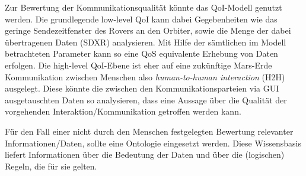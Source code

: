 Zur Bewertung der Kommunikationsqualit{\"a}t k{\"o}nnte das \gls{QoI}-Modell genutzt
werden. Die grundlegende low-level \gls{QoI} kann dabei Gegebenheiten wie das geringe
Sendezeitfenster des Rovers an den Orbiter, sowie die Menge der dabei
{\"u}bertragenen Daten (SDXR) analysieren. Mit Hilfe der s{\"a}mtlichen im
Modell betrachteten Parameter kann so eine \gls{QoS} equivalente Erhebung von
Daten erfolgen. Die high-level \gls{QoI}-Ebene ist eher auf eine zuk{\"u}nftige
Mars-Erde Kommunikation zwischen Menschen also \textit{human-to-human
interaction} (H2H) ausgelegt. Diese k{\"o}nnte die zwischen den
Kommunikationsparteien via GUI ausgetauschten Daten so analysieren, dass eine
Aussage {\"u}ber die Qualit{\"a}t der vorgehenden Interaktion/Kommunikation
getroffen werden kann.

F{\"u}r den Fall einer nicht durch den Menschen festgelegten Bewertung
relevanter Informationen/Daten, sollte eine Ontologie eingesetzt werden. Diese
Wissensbasis liefert Informationen {\"u}ber die Bedeutung der Daten und {\"u}ber
die (logischen) Regeln, die f{\"u}r sie gelten.
